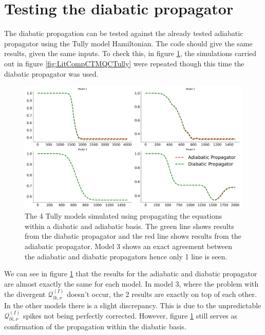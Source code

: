 \section{Testing the diabatic propagator}
The diabatic propagation can be tested against the already tested adiabatic propagator using the Tully model Hamiltonian. The code should give the same results, given the same inputs. To check this, in figure \ref{fig:diab_prop_vs_adiab}, the simulations carried out in figure \ref{fig:LitCompCTMQCTully} were repeated though this time the diabatic propagator was used.
\begin{figure}[ht]
  \includegraphics[width=\textwidth]{./img/CTMQC/TullyModels/CTMQC_ad_vs_di_wTraj_pops.png}
  \caption{\label{fig:diab_prop_vs_adiab}The 4 Tully models simulated using propagating the equations within a diabatic and adiabatic basis. The green line shows results from the diabatic propagator and the red line shows results from the adiabatic propagator. Model 3 shows an exact agreement between the adiabatic and diabatic propagators hence only 1 line is seen.}
\end{figure}
We can see in figure \ref{fig:diab_prop_vs_adiab} that the results for the adiabatic and diabatic propagator are almost exactly the same for each model. In model 3, where the problem with the divergent $\mathcal{Q}_{lk, \nu}^{(I)}$ doesn't occur, the 2 results are exactly on top of each other. In the other models there is a slight discrepancy. This is due to the unpredictable $\mathcal{Q}_{lk, \nu}^{(I)}$ spikes not being perfectly corrected. However, figure \ref{fig:diab_prop_vs_adiab} still serves as confirmation of the propagation within the diabatic basis.


